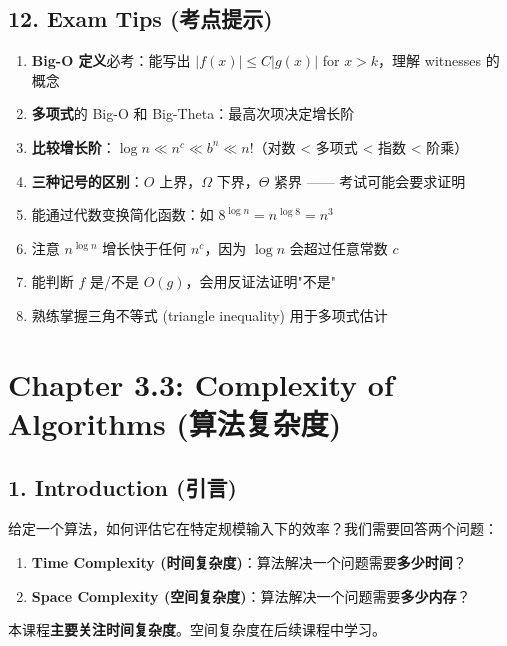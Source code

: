 \documentclass[10pt,a4paper,openany]{ctexbook}
\theoremstyle{definition}
\theoremstyle{remark}
\renewenvironment{quote}
  {\list{}{\leftmargin=1em\rightmargin=0pt\topsep=0.5pt\partopsep=0pt}\item[]}
  {\endlist}
\begin{document}
\vspace{-2pt}

\subsection{12. Exam Tips (考点提示)}

\begin{enumerate}
\item \textbf{Big-O 定义}必考：能写出 $|f(x)| \leq C|g(x)|$ for $x > k$，理解 witnesses 的概念
\item \textbf{多项式}的 Big-O 和 Big-Theta：最高次项决定增长阶
\item \textbf{比较增长阶}：$\log n \ll n^c \ll b^n \ll n!$（对数 < 多项式 < 指数 < 阶乘）
\item \textbf{三种记号的区别}：$O$ 上界，$\Omega$ 下界，$\Theta$ 紧界 —— 考试可能会要求证明
\item 能通过代数变换简化函数：如 $8^{\log n} = n^{\log 8} = n^3$
\item 注意 $n^{\log n}$ 增长快于任何 $n^c$，因为 $\log n$ 会超过任意常数 $c$
\item 能判断 $f$ 是/不是 $O(g)$，会用反证法证明"不是"
\item 熟练掌握三角不等式 (triangle inequality) 用于多项式估计

\end{enumerate}


\section{Chapter 3.3: Complexity of Algorithms (算法复杂度)}

\vspace{-2pt}

\subsection{1. Introduction (引言)}

给定一个算法，如何评估它在特定规模输入下的效率？我们需要回答两个问题：
\begin{enumerate}
\item \textbf{Time Complexity (时间复杂度)}：算法解决一个问题需要\textbf{多少时间}？
\item \textbf{Space Complexity (空间复杂度)}：算法解决一个问题需要\textbf{多少内存}？

\end{enumerate}

\begin{quote}
本课程\textbf{主要关注时间复杂度}。空间复杂度在后续课程中学习。

\end{quote}
\end{document}
